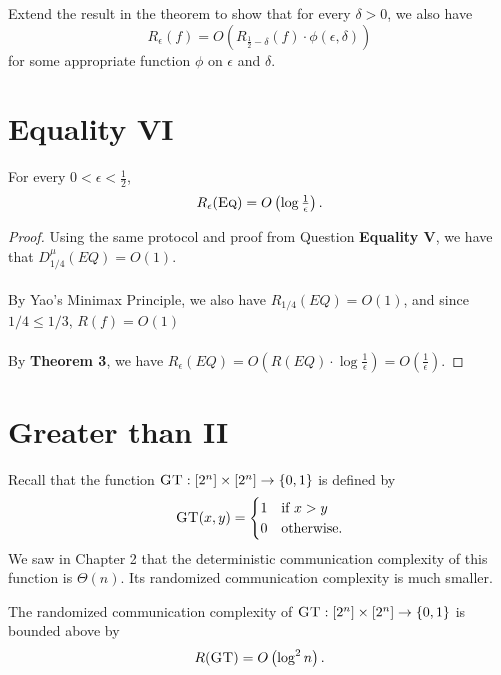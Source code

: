 \exercises

\begin{exercise}
	Extend the result in the theorem to show that for every $\delta > 0$, we also have
	\[
	R_\epsilon(f) = O\left( R_{\frac12 - \delta}(f) \cdot \phi(\epsilon,\delta) \right)
	\]
	for some appropriate function $\phi$ on $\epsilon$ and $\delta$.
\end{exercise}



\section{Equality VI}


\begin{theorem}
	For every $0 < \epsilon < \frac12$,
	\[
	R_\epsilon(\textsc{Eq}) = O\left(\log \tfrac1\epsilon \right).
	\]
\end{theorem}

\begin{proof}
	Using the same protocol and proof from Question \textbf{Equality V}, we have that $D_{1/4}^{\mu}(EQ) = O(1)$. \\
	\\
	By Yao's Minimax Principle, we also have $R_{1/4}(EQ) = O(1)$, and since $1/4 \leq 1/3$, $R(f) = O(1)$\\
	\\
	By \textbf{Theorem 3}, we have $R_{\epsilon}(EQ) = O(R(EQ) \cdot \log \frac{1}{\epsilon}) = O(\frac{1}{\epsilon})$.
\end{proof}



\section{Greater than II}

Recall that the function $\textsc{GT} : [2^n] \times [2^n] \to \{0,1\}$ is defined by
\[
\textsc{GT}(x,y) = \begin{cases}
1 & \mbox{if } x > y \\
0 & \mbox{otherwise.}
\end{cases}
\]
We saw in Chapter 2 that the deterministic communication complexity of this function is $\Theta(n)$. Its randomized communication complexity is much smaller.

\begin{theorem}
	The randomized communication complexity of $\textsc{GT} : [2^n] \times [2^n] \to \{0,1\}$ is bounded above by
	\[
	R(\textsc{GT}) = O\left(\log^2 n \right).
	\]
\end{theorem}


